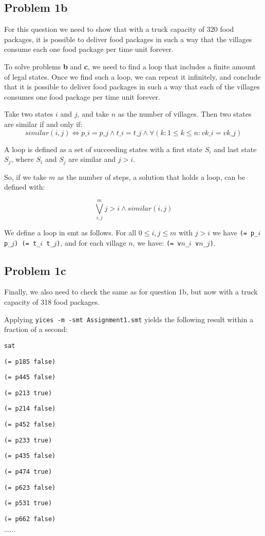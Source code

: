 \documentclass[a4paper]{article}
\begin{document}
	\subsection*{Problem 1b}

	For this question we need to show that with a truck capacity of 320 food packages, it is possible to deliver food packages in such a way that the villages consume each one food package per time unit forever.
	
	To solve problems \textbf{b} and \textbf{c}, we need to find a loop that includes a finite amount of legal states. Once we find such a loop, we can repeat it infinitely, and conclude that it is possible to deliver food packages in such a way that each of the villages consumes one food package per time unit forever.
	
	Take two states $i$ and $j$, and take $n$ as the number of villages. Then two states are similar if and only if:
	$$similar(i, j) \Leftrightarrow p\_i = p\_j \wedge t\_i = t\_j \wedge \forall (k: 1 \leq k \leq n : vk\_i = vk\_j)$$
	
	A loop is defined as a set of succeeding states with a first state $S_i$ and last state $S_j$, where $S_i$ and $S_j$ are similar and $j > i$.
	
	So, if we take $m$ as the number of steps, a solution that holds a loop, can be defined with:
	
	$$\bigvee_{i, j}^m j > i \wedge similar(i, j)$$
	
	We define a loop in smt as follows. For all $0 \leq i, j \leq m$ with $j > i$ we have {\tt (= p\_$i$ p\_$j$) (= t\_$i$ t\_$j$)}, and for each village $n$, we have: {\tt (= v$n$\_$i$ v$n$\_$j$)}.
	
	
	\subsection*{Problem 1c}
	Finally, we also need to check the same as for question 1b, but now with a truck capacity of 318 food packages.

Applying {\tt yices -m -smt Assignment1.smt} yields the following result
within a fraction of a second:

{\footnotesize

{\tt sat }

{\tt (= p185 false)}

{\tt (= p445 false)}

{\tt (= p213 true)}

{\tt (= p214 false)}

{\tt (= p452 false)}

{\tt (= p233 true)}

{\tt (= p435 false)}

{\tt (= p474 true)}

{\tt (= p623 false)}

{\tt (= p531 true)}

{\tt (= p662 false)}

$\cdots \cdots$ }
\end{document}
